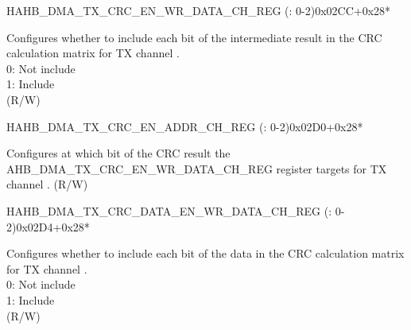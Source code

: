 \begin{register}{H}{AHB\_DMA\_TX\_CRC\_EN\_WR\_DATA\_CH\_REG (: 0-2)}{0x02CC+0x28*}\label{regdesc:AHBDMATXCRCENWRDATACHNREG}
%
\regnewline%
\begin{regdesc}\begin{reglist}
\label{fielddesc:AHBDMATXCRCENWRDATACHN}\item [AHB\_DMA\_TX\_CRC\_EN\_WR\_DATA\_CH\regindex{n}] Configures whether to include each bit of the intermediate result in the CRC calculation matrix for TX channel .\\
0: Not include\\
1: Include\\ (R/W)
\end{reglist}\end{regdesc}
\end{register}


\begin{register}{H}{AHB\_DMA\_TX\_CRC\_EN\_ADDR\_CH\_REG (: 0-2)}{0x02D0+0x28*}\label{regdesc:AHBDMATXCRCENADDRCHNREG}
%
\regnewline%
\begin{regdesc}\begin{reglist}
\label{fielddesc:AHBDMATXCRCENADDRCHN}\item [AHB\_DMA\_TX\_CRC\_EN\_ADDR\_CH\regindex{n}] Configures at which bit of the CRC result the AHB\_DMA\_TX\_CRC\_EN\_WR\_DATA\_CH\_REG register targets for TX channel . (R/W)
\end{reglist}\end{regdesc}
\end{register}


\begin{register}{H}{AHB\_DMA\_TX\_CRC\_DATA\_EN\_WR\_DATA\_CH\_REG (: 0-2)}{0x02D4+0x28*}\label{regdesc:AHBDMATXCRCDATAENWRDATACHNREG}
%
%
\regnewline%
\begin{regdesc}\begin{reglist}
\label{fielddesc:AHBDMATXCRCDATAENWRDATACHN}\item [AHB\_DMA\_TX\_CRC\_DATA\_EN\_WR\_DATA\_CH\regindex{n}] Configures whether to include each bit of the data in the CRC calculation matrix for TX channel .\\
0: Not include\\
1: Include\\ (R/W)
\end{reglist}\end{regdesc}
\end{register}


